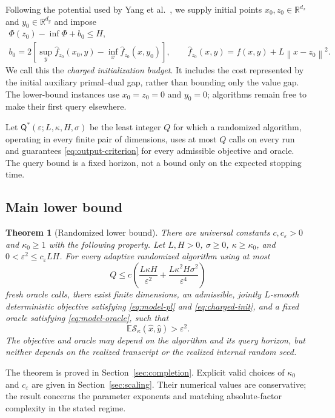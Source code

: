 \documentclass[11pt,a4paper]{article}
\newcommand{\R}{\mathbb R}
\newcommand{\E}{\mathbb E}
\newcommand{\eps}{\varepsilon}
\newcommand{\norm}[1]{\left\lVert #1\right\rVert}
\newcommand{\res}{\mathcal S_\kappa}
\newtheorem{theorem}{Theorem}[section]
\theoremstyle{definition}
\theoremstyle{remark}
\numberwithin{equation}{section}
\begin{document}
Following the potential used by Yang et al.~\cite{yang}, we supply
initial points $x_0,z_0\in\R^{d_x}$ and $y_0\in\R^{d_y}$ and impose
\begin{equation}
 \begin{gathered}
 \Phi(z_0)-\inf\Phi+b_0\le H,\\
 b_0=2\left[
   \sup_y\widehat f_{z_0}(x_0,y)
   -\inf_x\widehat f_{z_0}(x,y_0)
 \right],\qquad
 \widehat f_{z_0}(x,y)=f(x,y)+L\norm{x-z_0}^2.
 \end{gathered}
 \label{eq:charged-init}
\end{equation}
We call this the \emph{charged initialization budget}. It includes the
cost represented by the initial auxiliary primal--dual gap, rather than
bounding only the value gap. The lower-bound instances use
$x_0=z_0=0$ and $y_0=0$; algorithms remain free to make their first
query elsewhere.

Let $\mathsf Q^*(\eps;L,\kappa,H,\sigma)$ be the least integer $Q$
for which a randomized algorithm, operating in every finite pair of
dimensions, uses at most $Q$ calls on every run and guarantees
\eqref{eq:output-criterion} for every admissible objective and oracle.
The query bound is a fixed horizon, not a bound only on the expected
stopping time.

\subsection{Main lower bound}

\begin{theorem}[Randomized lower bound]
\label{thm:main-lower}
There are universal constants $c,c_\eps>0$ and $\kappa_0\ge1$ with
the following property. Let $L,H>0$, $\sigma\ge0$,
$\kappa\ge\kappa_0$, and $0<\eps^2\le c_\eps LH$.
For every adaptive randomized algorithm using at most
\[
 Q\le c\left(
   \frac{L\kappa H}{\eps^2}
   +\frac{L\kappa^2H\sigma^2}{\eps^4}
 \right)
\]
fresh oracle calls, there exist finite dimensions, an admissible,
jointly $L$-smooth deterministic objective satisfying
\eqref{eq:model-pl} and \eqref{eq:charged-init},
and a fixed oracle satisfying \eqref{eq:model-oracle}, such that
\[
 \E\res(\widehat x,\widehat y)>\eps^2.
\]
The objective and oracle may depend on the algorithm and its query
horizon, but neither depends on the realized transcript or the realized
internal random seed.
\end{theorem}

The theorem is proved in Section~\ref{sec:completion}. Explicit valid
choices of $\kappa_0$ and $c_\eps$ are given in
Section~\ref{sec:scaling}. Their numerical values are conservative;
the result concerns the parameter exponents and matching absolute-factor
complexity in the stated regime.
\end{document}

